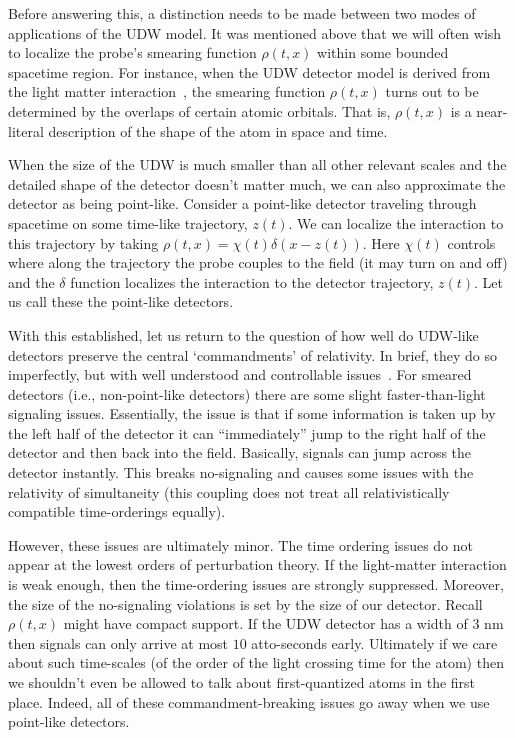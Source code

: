 \documentclass[12pt,prd,superscriptaddress,floatfix,amsmath,amssymb,amsfonts,nofootinbib]{revtex4-2}
\begin{document}
Before answering this, a distinction needs to be made between two modes of applications of the UDW model. It was mentioned above that we will often wish to localize the probe's smearing function $\rho(t,x)$ within some bounded spacetime region. For instance, when the UDW detector model is derived from the light matter interaction~\cite{Pablo,RichardEdu,Richard}, the smearing function $\rho(t,x)$ turns out to be determined by the overlaps of certain atomic orbitals. That is, $\rho(t,x)$ is a near-literal description of the shape of the atom in space and time. 

When the size of the UDW is much smaller than all other relevant scales and the detailed shape of the detector doesn't matter much, we can also approximate the detector as being point-like. Consider a point-like detector traveling through spacetime on some time-like trajectory, $z(t)$. We can localize the interaction to this trajectory by taking \mbox{$\rho(t,x)=\chi(t)\delta(x-z(t))$}. Here $\chi(t)$ controls where along the trajectory the probe couples to the field (it may turn on and off) and the $\delta$ function localizes the interaction to the detector trajectory, $z(t)$. Let us call these the point-like detectors.

With this established, let us return to the question of how well do UDW-like detectors preserve the central `commandments' of relativity. In brief, they do so imperfectly, but with well understood and controllable issues~\cite{BrokenCovariance,JoseMariaEdu}. For smeared detectors (i.e., non-point-like detectors) there are some slight faster-than-light signaling issues. Essentially, the issue is that if some information is taken up by the left half of the detector it can ``immediately'' jump to the right half of the detector and then back into the field. Basically, signals can jump across the detector instantly. This breaks no-signaling and causes some issues with the relativity of simultaneity (this coupling does not treat all relativistically compatible time-orderings equally). 

However, these issues are ultimately minor. The time ordering issues do not appear at the lowest orders of perturbation theory. If the light-matter interaction is weak enough, then the time-ordering issues are strongly suppressed. Moreover, the size of the no-signaling violations is set by the size of our detector. Recall $\rho(t,x)$ might have compact support. If the UDW detector has a width of $3\text{ nm}$ then signals can only arrive at most $10$ atto-seconds early. Ultimately if we care about such time-scales (of the order of the light crossing time for the atom) then we shouldn't even be allowed to talk about first-quantized atoms in the first place. Indeed, all of these commandment-breaking issues go away when we use point-like detectors.
\end{document}

